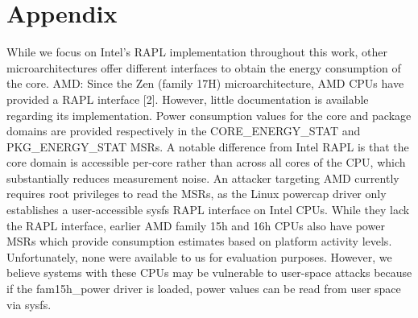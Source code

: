 \appendix
\section{Appendix}
\label{sec:appendix}
While we focus on Intel’s RAPL implementation throughout this work, other microarchitectures offer different interfaces to obtain the energy consumption of the core.
AMD: Since the Zen (family 17H)  microarchitecture, AMD CPUs have provided a RAPL interface [2]. However, little documentation is available regarding its implementation. 
Power consumption values for the core and package domains are provided respectively in the CORE\_ENERGY\_STAT and
PKG\_ENERGY\_STAT MSRs. A notable difference from Intel RAPL is that the core domain is accessible per-core rather than across all cores of the CPU, which substantially reduces
measurement noise. An attacker targeting AMD currently requires root privileges to read the MSRs, as the Linux powercap driver
only establishes a user-accessible sysfs RAPL interface on Intel CPUs. While they lack the RAPL interface, earlier AMD family 15h and 16h CPUs also have power MSRs which provide consumption estimates based on platform activity levels. Unfortunately, none were available to us for evaluation purposes. However, we believe systems with these
CPUs may be vulnerable to user-space attacks because if the fam15h\_power driver is loaded, power values can be read from user space via sysfs.
